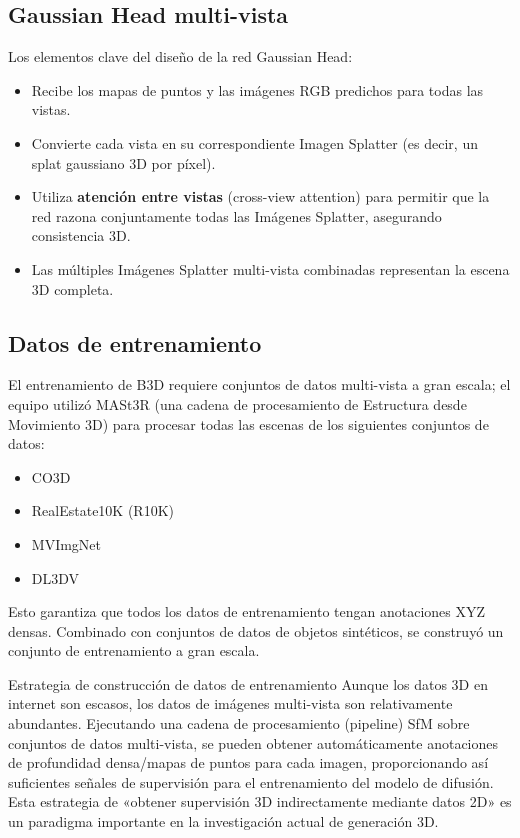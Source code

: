 \documentclass[a4paper]{article}
\begin{document}
\subsection{Gaussian Head multi-vista}

Los elementos clave del diseño de la red Gaussian Head:

\begin{itemize}
    \item Recibe los mapas de puntos y las imágenes RGB predichos para todas las vistas.
    \item Convierte cada vista en su correspondiente Imagen Splatter (es decir, un splat gaussiano 3D por píxel).
    \item Utiliza \textbf{atención entre vistas} (cross-view attention) para permitir que la red razona conjuntamente todas las Imágenes Splatter, asegurando consistencia 3D.
    \item Las múltiples Imágenes Splatter multi-vista combinadas representan la escena 3D completa.
\end{itemize}

\subsection{Datos de entrenamiento}

El entrenamiento de B3D requiere conjuntos de datos multi-vista a gran escala; el equipo utilizó MASt3R (una cadena de procesamiento de Estructura desde Movimiento 3D) para procesar todas las escenas de los siguientes conjuntos de datos:

\begin{itemize}
    \item CO3D
    \item RealEstate10K (R10K)
    \item MVImgNet
    \item DL3DV
\end{itemize}

Esto garantiza que todos los datos de entrenamiento tengan anotaciones XYZ densas. Combinado con conjuntos de datos de objetos sintéticos, se construyó un conjunto de entrenamiento a gran escala.

\begin{knowledgebox}{Estrategia de construcción de datos de entrenamiento}
Aunque los datos 3D en internet son escasos, los datos de imágenes multi-vista son relativamente abundantes. Ejecutando una cadena de procesamiento (pipeline) SfM sobre conjuntos de datos multi-vista, se pueden obtener automáticamente anotaciones de profundidad densa/mapas de puntos para cada imagen, proporcionando así suficientes señales de supervisión para el entrenamiento del modelo de difusión. Esta estrategia de «obtener supervisión 3D indirectamente mediante datos 2D» es un paradigma importante en la investigación actual de generación 3D.
\end{knowledgebox}
\end{document}
